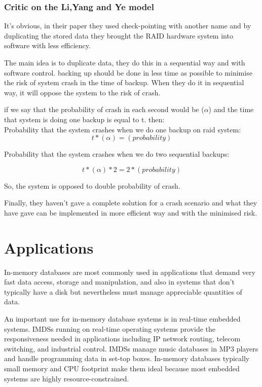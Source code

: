\documentclass[12pt]{article} %
\begin{document}
\subsubsection{Critic on the Li,Yang and Ye model}

It's obvious, in their paper they used check-pointing with another name and by duplicating the stored data they brought the RAID hardware system into software with less efficiency.

The main idea is to duplicate data, they do this in a sequential way and with software control. backing up should be done in less time as possible to minimise the risk of system crash in the time of backup. When they do it in sequential way, it will oppose the system to the risk of crash.

if we say that the probability of crash in each second would be ($\alpha$) and the time that system is doing one backup is equal to t. then:\\

Probability that the system crashes when we do one backup on raid system:
\begin{equation}
 t*(\alpha) = (probability)
\end{equation}

Probability that the system crashes when we do two sequential backups:

\begin{equation}
 t*(\alpha)*2 = 2*(probability)
\end{equation}

So, the system is opposed to double probability of crash.

Finally, they haven't gave a complete solution for a crash scenario and what they have gave can be implemented in more efficient way and with the minimised risk.

\section{Applications}

In-memory databases are most commonly used in applications that demand very fast data access, storage and manipulation, and also in systems that don't typically have a disk but nevertheless must manage appreciable quantities of data.

An important use for in-memory database systems is in real-time embedded systems. IMDSs running on real-time operating systems provide the responsiveness needed in applications including IP network routing, telecom switching, and industrial control. IMDSs manage music databases in MP3 players and handle programming data in set-top boxes. In-memory databases typically small memory and CPU footprint make them ideal because most embedded systems are highly resource-constrained.
\end{document}
